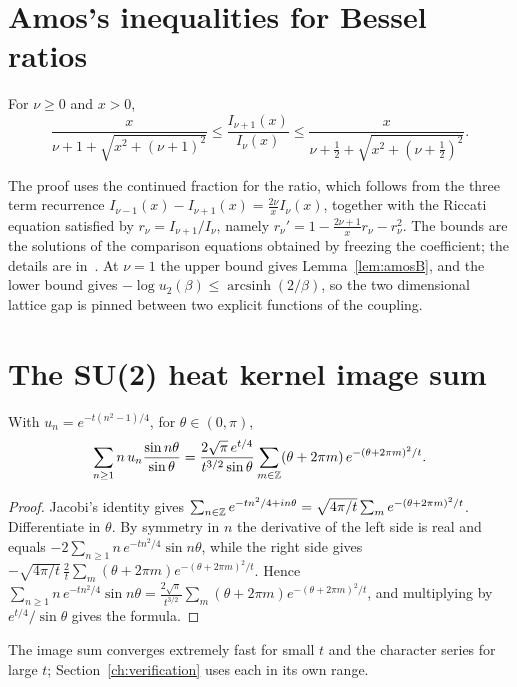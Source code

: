 \section{Amos's inequalities for Bessel ratios}

\begin{theorem}
For $\nu\ge0$ and $x>0$,
\[
\frac{x}{\nu+1+\sqrt{x^2+(\nu+1)^2}}\le\frac{I_{\nu+1}(x)}{I_\nu(x)}\le\frac{x}{\nu+\frac12+\sqrt{x^2+(\nu+\frac12)^2}} .
\]
\end{theorem}

The proof uses the continued fraction for the ratio, which follows from the three term recurrence $I_{\nu-1}(x)-I_{\nu+1}(x)=\frac{2\nu}{x}I_\nu(x)$, together with the Riccati equation satisfied by $r_\nu=I_{\nu+1}/I_\nu$, namely $r_\nu'=1-\frac{2\nu+1}{x}r_\nu-r_\nu^2$. The bounds are the solutions of the comparison equations obtained by freezing the coefficient; the details are in~\cite{Am74}. At $\nu=1$ the upper bound gives Lemma~\ref{lem:amosB}, and the lower bound gives $-\log u_2(\beta)\le\operatorname{arcsinh}(2/\beta)$, so the two dimensional lattice gap is pinned between two explicit functions of the coupling.

\section{The SU(2) heat kernel image sum}

\begin{proposition}
With $u_n=e^{-t(n^2-1)/4}$, for $\theta\in(0,\pi)$,
\[
\sum_{n\ge1}n\,u_n\frac{\sin n\theta}{\sin\theta}=\frac{2\sqrt\pi\,e^{t/4}}{t^{3/2}\sin\theta}\sum_{m\in\mathbb{Z}}(\theta+2\pi m)\,e^{-(\theta+2\pi m)^2/t}.
\]
\end{proposition}

\begin{proof}
Jacobi's identity gives $\sum_{n\in\mathbb{Z}}e^{-tn^2/4+in\theta}=\sqrt{4\pi/t}\sum_me^{-(\theta+2\pi m)^2/t}$. Differentiate in $\theta$. By symmetry in $n$ the derivative of the left side is real and equals $-2\sum_{n\ge1}n\,e^{-tn^2/4}\sin n\theta$, while the right side gives $-\sqrt{4\pi/t}\,\frac2t\sum_m(\theta+2\pi m)e^{-(\theta+2\pi m)^2/t}$. Hence $\sum_{n\ge1}n\,e^{-tn^2/4}\sin n\theta=\frac{2\sqrt\pi}{t^{3/2}}\sum_m(\theta+2\pi m)e^{-(\theta+2\pi m)^2/t}$, and multiplying by $e^{t/4}/\sin\theta$ gives the formula.
\end{proof}

The image sum converges extremely fast for small $t$ and the character series for large $t$; Section~\ref{ch:verification} uses each in its own range.

